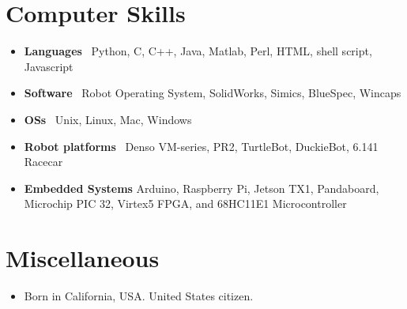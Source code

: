 \documentclass[10pt,letterpaper]{article}
\begin{document}
\section*{Computer Skills}

\begin{itemize}
	\item \textbf{Languages} \ Python, C, C++, Java, Matlab, Perl, HTML, shell script, Javascript
	\item \textbf{Software} \ Robot Operating System, SolidWorks, Simics, BlueSpec, Wincaps
	\item \textbf{OSs} \ Unix, Linux,  Mac, Windows
	\item \textbf{Robot platforms} \ Denso VM-series, PR2, TurtleBot, DuckieBot, 6.141 Racecar
	\item \textbf{Embedded Systems} Arduino, Raspberry Pi, Jetson TX1, Pandaboard, Microchip PIC 32, Virtex5 FPGA, and  68HC11E1 Microcontroller 
\end{itemize}


\section*{Miscellaneous}

\begin{itemize}
\item Born in California, USA. United States citizen.
\end{itemize}
\end{document}
